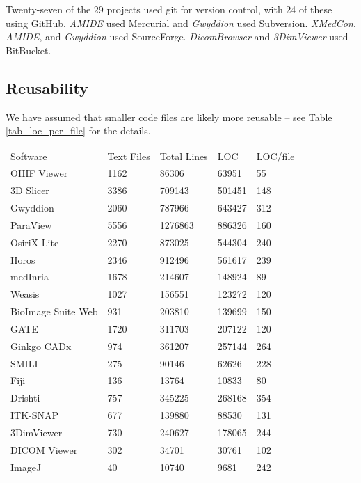 \documentclass[final, 12pt, 3p, times]{elsarticle}
\begin{document}
Twenty-seven of the 29 projects used git for version control, with 24 of
these using GitHub. \textit{AMIDE} used Mercurial and \textit{Gwyddion} used
Subversion. \textit{XMedCon}, \textit{AMIDE}, and \textit{Gwyddion} used
SourceForge. \textit{DicomBrowser} and \textit{3DimViewer} used BitBucket. 

\subsection{Reusability} \label{sec_result_reusability}

We have assumed that smaller code files are
likely more reusable -- see Table \ref{tab_loc_per_file} for the details.

\begin{table}[ht]
\centering
\begin{tabular}{lllll}
\toprule
\multirow{2}{*}{Software} & \multirow{2}{*}{Text Files} & \multirow{2}{*}{Total Lines} & \multirow{2}{*}{LOC} & \multirow{2}{*}{LOC/file} \\
 &  &  &  &  \\ 
\midrule
OHIF Viewer & 1162 & 86306 & 63951 & 55 \\
3D Slicer & 3386 & 709143 & 501451 & 148 \\
Gwyddion & 2060 & 787966 & 643427 & 312 \\
ParaView & 5556 & 1276863 & 886326 & 160 \\
OsiriX Lite & 2270 & 873025 & 544304 & 240 \\
Horos & 2346 & 912496 & 561617 & 239 \\
medInria & 1678 & 214607 & 148924 & 89 \\
Weasis & 1027 & 156551 & 123272 & 120 \\
BioImage Suite Web & 931 & 203810 & 139699 & 150 \\
GATE & 1720 & 311703 & 207122 & 120 \\
Ginkgo CADx & 974 & 361207 & 257144 & 264 \\
SMILI & 275 & 90146 & 62626 & 228 \\
Fiji & 136 & 13764 & 10833 & 80 \\
Drishti & 757 & 345225 & 268168 & 354 \\
ITK-SNAP & 677 & 139880 & 88530 & 131 \\
3DimViewer & 730 & 240627 & 178065 & 244 \\
DICOM Viewer & 302 & 34701 & 30761 & 102 \\
ImageJ & 40 & 10740 & 9681 & 242 \\

\end{tabular}
\end{table}
\end{document}
